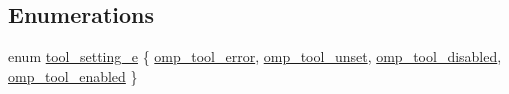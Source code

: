 \subsection*{Enumerations}
\begin{DoxyCompactItemize}
\item 
enum \hyperlink{ompt-general_8c_ab0b313a63028003b4a1588cc33930150}{tool\-\_\-setting\-\_\-e} \{ \hyperlink{ompt-general_8c_ab0b313a63028003b4a1588cc33930150a1779489eca2c49f635fcfab7266ef80f}{omp\-\_\-tool\-\_\-error}, 
\hyperlink{ompt-general_8c_ab0b313a63028003b4a1588cc33930150abe3b1ebe5606a3de4251e2db7740c2de}{omp\-\_\-tool\-\_\-unset}, 
\hyperlink{ompt-general_8c_ab0b313a63028003b4a1588cc33930150acde951fd07e4a6b885afb8598632ea73}{omp\-\_\-tool\-\_\-disabled}, 
\hyperlink{ompt-general_8c_ab0b313a63028003b4a1588cc33930150a5fb54a43c51391a74611e52e8dd7d5b9}{omp\-\_\-tool\-\_\-enabled}
 \}
\end{DoxyCompactItemize}
